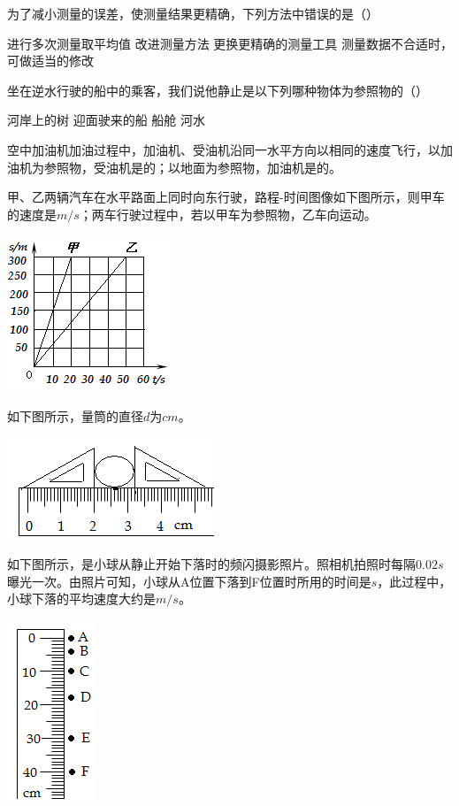 \documentclass[12pt]{exam}%
\begin{document}
\begin{Aquestions}
\begin{questions}
\question
为了减小测量的误差，使测量结果更精确，下列方法中错误的是（）
\begin{choices}
\choice 进行多次测量取平均值
\choice 改进测量方法
\choice 更换更精确的测量工具
\choice 测量数据不合适时，可做适当的修改
\end{choices}


\question
坐在逆水行驶的船中的乘客，我们说他静止是以下列哪种物体为参照物的（\answerline*[C]）

\begin{oneparchoices}
\choice 河岸上的树
\choice 迎面驶来的船
\choice 船舱 
\choice 河水
\end{oneparchoices}


\question
空中加油机加油过程中，加油机、受油机沿同一水平方向以相同的速度飞行，以加油机为参照物，受油机是\answerline*[静止]的；以地面为参照物，加油机是\answerline*[运动]的。


\question
甲、乙两辆汽车在水平路面上同时向东行驶，路程-时间图像如下图所示，则甲车的速度是\answerline*[15]$m/s$；两车行驶过程中，若以甲车为参照物，乙车向\answerline*[西]运动。

\includegraphics[scale=1]{figures/图片11.png} 


\question
如下图所示，量筒的直径$d$为\answerline*[1.20]$cm$。

\includegraphics[scale=1]{figures/图片12.png} 


\question
如下图所示，是小球从静止开始下落时的频闪摄影照片。照相机拍照时每隔$0.02s$曝光一次。由照片可知，小球从A位置下落到F位置时所用的时间是\answerline*[0.1]$s$，此过程中，小球下落的平均速度大约是\answerline*[4]$m/s$。

\includegraphics[scale=1]{figures/图片13.png} 



\end{questions}
\end{Aquestions}
\end{document}
